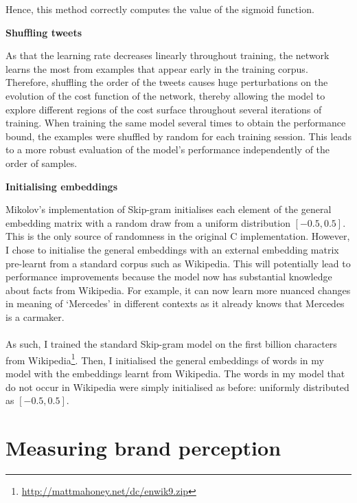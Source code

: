 \documentclass[a4paper,12pt,twoside,openright]{report}
\newcommand{\tb}{\vspace{10pt} \textbf}
\newcommand{\nl}{\\ \\}
\begin{document}
Hence, this method correctly computes the value of the sigmoid function.

\tb{Shuffling tweets}

As that the learning rate decreases linearly throughout training, the network learns the most from examples that appear early in the training corpus. Therefore, shuffling the order of the tweets causes huge perturbations on the evolution of the cost function of the network, thereby allowing the model to explore different regions of the cost surface throughout several iterations of training. When training the same model several times to obtain the performance bound, the examples were shuffled by random for each training session. This leads to a more robust evaluation of the model's performance independently of the order of samples. 

\tb{Initialising embeddings}

Mikolov's implementation of Skip-gram initialises each element of the general embedding matrix with a random draw from a uniform distribution $[-0.5, 0.5].$ This is the only source of randomness in the original C implementation. However, I chose to initialise the general embeddings with an external embedding matrix pre-learnt from a standard corpus such as Wikipedia. This will potentially lead to performance improvements because the model now has substantial knowledge about facts from Wikipedia. For example, it can now learn more nuanced changes in meaning of `Mercedes' in different contexts as it already knows that Mercedes is a carmaker. 
\nl 
As such, I trained the standard Skip-gram model on the first billion characters from Wikipedia\footnote{\url{http://mattmahoney.net/dc/enwik9.zip}}. Then, I initialised the general embeddings of words in my model with the embeddings learnt from Wikipedia. The words in my model that do not occur in Wikipedia were simply initialised as before: uniformly distributed as $[-0.5,0.5].$

\section{Measuring brand perception}
\end{document}
